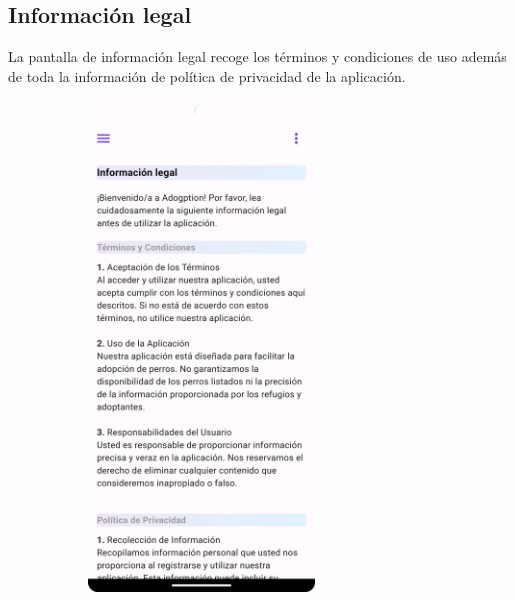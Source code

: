 \documentclass[a4paper, 12pt]{article}
\begin{document}
\newpage
\subsection*{Información legal}

La pantalla de información legal recoge los términos y condiciones de uso además de toda la información de política de privacidad de la aplicación.

\begin{figure}[H]
   	\begin{subfigure}{0.48\textwidth}
		\begin{center}
			{\includegraphics[width=6cm]{app/LegalPage.png}\par}
		\end{center}  
	\end{subfigure}\hfill
   	\begin{subfigure}{0.48\textwidth}
		\begin{center}

\end{center}
\end{subfigure}
\end{figure}
\end{document}
